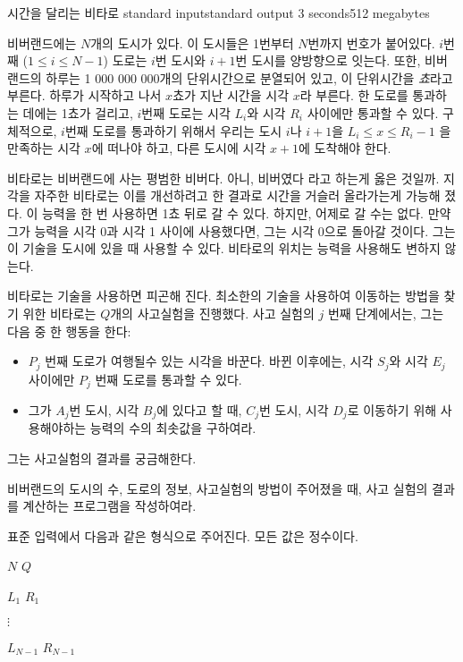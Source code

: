 \begin{problem}{시간을 달리는 비타로}
	{standard input}{standard output}
	{3 seconds}{512 megabytes}{}
	
	비버랜드에는 $N$개의 도시가 있다. 이 도시들은 1번부터 $N$번까지 번호가 붙어있다. $i$번째 ($1 \le i \le N-1$) 도로는 $i$번 도시와 $i+1$번 도시를 양방향으로 잇는다. 또한, 비버랜드의 하루는 1 000 000 000개의 단위시간으로 분열되어 있고, 이 단위시간을 \textit{쵸}라고 부른다. 하루가 시작하고 나서 $x$쵸가 지난 시간을 시각 $x$라 부른다. 한 도로를 통과하는 데에는 1쵸가 걸리고, $i$번째 도로는 시각 $L_i$와 시각 $R_i$ 사이에만 통과할 수 있다. 구체적으로, $i$번째 도로를 통과하기 위해서 우리는 도시 $i$나 $i+1$을 $L_i \le x \le R_i -1$ 을 만족하는 시각 $x$에 떠나야 하고, 다른 도시에 시각 $x+1$에 도착해야 한다.
	
	비타로는 비버랜드에 사는 평범한 비버다. 아니, 비버였다 라고 하는게 옳은 것일까. 지각을 자주한 비타로는 이를 개선하려고 한 결과로 시간을 거슬러 올라가는게 가능해 졌다. 이 능력을 한 번 사용하면 1쵸 뒤로 갈 수 있다. 하지만, 어제로 갈 수는 없다. 만약 그가 능력을 시각 0과 시각 1 사이에 사용했다면, 그는 시각 0으로 돌아갈 것이다. 그는 이 기술을 도시에 있을 때 사용할 수 있다. 비타로의 위치는 능력을 사용해도 변하지 않는다.
	
	비타로는 기술을 사용하면 피곤해 진다. 최소한의 기술을 사용하여 이동하는 방법을 찾기 위한 비타로는 $Q$개의 사고실험을 진행했다. 사고 실험의 $j$ 번째 단계에서는, 그는 다음 중 한 행동을 한다:
	
	\begin{itemize}
		\item $P_j$ 번째 도로가 여행될수 있는 시각을 바꾼다. 바뀐 이후에는, 시각 $S_j$와 시각 $E_j$ 사이에만 $P_j$ 번째 도로를 통과할 수 있다.
		\item 그가 $A_j$번 도시, 시각 $B_j$에 있다고 할 때, $C_j$번 도시, 시각 $D_j$로 이동하기 위해 사용해야하는 능력의 수의 최솟값을 구하여라.
	\end{itemize}

	그는 사고실험의 결과를 궁금해한다.
	
	비버랜드의 도시의 수, 도로의 정보, 사고실험의 방법이 주어졌을 때, 사고 실험의 결과를 계산하는 프로그램을 작성하여라.
	
	
	\InputFile
	
	표준 입력에서 다음과 같은 형식으로 주어진다. 모든 값은 정수이다.
	
	$N$ $Q$
	
	$L_1$ $R_1$
	
	$\vdots$
	
	$L_{N-1}$ $R_{N-1}$
	

\end{problem}
